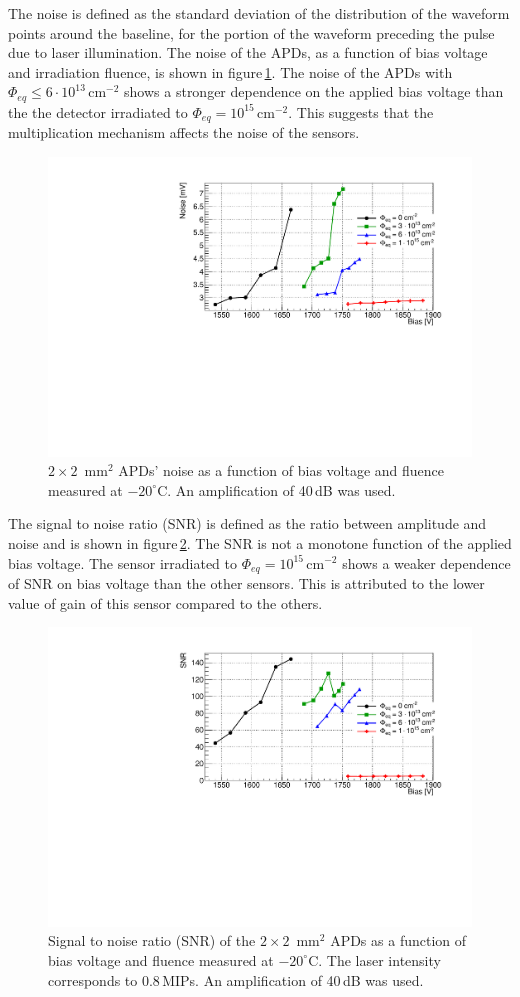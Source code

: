 \documentclass[review,number,sort&compress]{elsarticle}
\begin{document}
The noise is defined as the standard deviation of the distribution of the waveform points around the baseline, for the portion of the waveform preceding the pulse due to laser illumination.
The noise of the APDs, as a function of bias voltage and irradiation fluence, is shown in figure\,\ref{fig:noise2x2}.
The noise of the APDs with $\Phi_{eq} \leq 6 \cdot 10^{13}$\,cm$^{-2}$ shows a stronger dependence on the applied bias voltage than the the detector irradiated to $\Phi_{eq} = 10^{15}$\,cm$^{-2}$.
This suggests that the multiplication mechanism affects the noise of the sensors.

\begin{figure}
  \centering
  \includegraphics[width = 0.6 \columnwidth]{noise2x2APDs}
  \caption{$2 \times 2$~mm$^2$ APDs' noise as a function of bias voltage and fluence measured at $-20^\circ$C. An amplification of 40\,dB was used.}
  \label{fig:noise2x2}
\end{figure}

The signal to noise ratio (SNR) is defined as the ratio between amplitude and noise and is shown in figure\,\ref{fig:snr2x2}.
The SNR is not a monotone function of the applied bias voltage.
The sensor irradiated to $\Phi_{eq} = 10^{15}$\,cm$^{-2}$ shows a weaker dependence of SNR on bias voltage than the other sensors.
This is attributed to the lower value of gain of this sensor compared to the others.

\begin{figure}
  \centering
  \includegraphics[width = 0.6 \columnwidth]{snr2x2APDs}
  \caption{Signal to noise ratio (SNR) of the $2 \times 2$~mm$^2$ APDs as a function of bias voltage and fluence measured at $-20^\circ$C. The laser intensity corresponds to 0.8\,MIPs. An amplification of 40\,dB was used.}
  \label{fig:snr2x2}
\end{figure}
\end{document}
